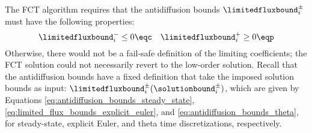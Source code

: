 The FCT algorithm requires that the antidiffusion bounds
$\limitedfluxbound_i^\pm$ must have the following properties:
\begin{equation}\label{eq:antidiffusion_bounds_properties}
  \limitedfluxbound_i^-\leq 0 \eqc \quad \limitedfluxbound_i^+\geq 0 \eqp
\end{equation}
Otherwise, there would not be a fail-safe definition of the limiting
coefficients; the FCT solution could not necessarily revert to the low-order
solution.
Recall that the antidiffusion bounds have a fixed definition that take the
imposed solution bounds as input:
$\limitedfluxbound_i^\pm(\solutionbound_i^\pm)$, which are given
by Equations
\eqref{eq:antidiffusion_bounds_steady_state},
\eqref{eq:limited_flux_bounds_explicit_euler}, and
\eqref{eq:antidiffusion_bounds_theta},
for steady-state, explicit Euler, and theta time discretizations, respectively.

